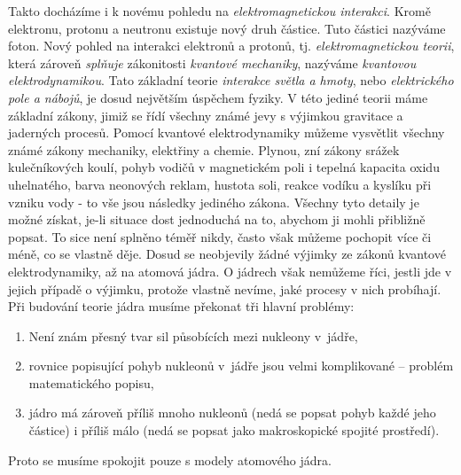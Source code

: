 {    Takto docházíme i k novému pohledu na \emph{elektromagnetickou interakci}. Kromě elektronu, 
    protonu a neutronu existuje nový druh částice. Tuto částici nazýváme foton. Nový pohled na 
    interakci elektronů a protonů, tj. \emph{elektromagnetickou teorii}, která zároveň 
    \emph{splňuje} zákonitosti \emph{kvantové mechaniky}, nazýváme \emph{kvantovou 
    elektrodynamikou}. Tato základní teorie \emph{interakce světla a hmoty}, nebo 
    \emph{elektrického pole a nábojů}, je dosud největším úspěchem fyziky. V této jediné teorii 
    máme základní zákony, jimiž se řídí všechny známé jevy s výjimkou gravitace a jaderných 
    procesů. Pomocí kvantové elektrodynamiky můžeme vysvětlit všechny známé zákony mechaniky, 
    elektřiny a chemie. Plynou, zní zákony srážek kulečníkových koulí, pohyb vodičů v magnetickém 
    poli i tepelná kapacita oxidu uhelnatého, barva neonových reklam, hustota soli, reakce vodíku a 
    kyslíku při vzniku vody - to vše jsou následky jediného zákona. Všechny tyto detaily je možné 
    získat, je-li situace dost jednoduchá na to, abychom ji mohli přibližně popsat. To sice není 
    splněno téměř nikdy, často však můžeme pochopit více či méně, co se vlastně děje. Dosud se 
    neobjevily žádné výjimky ze zákonů kvantové elektrodynamiky, až na atomová jádra. O jádrech 
    však nemůžeme říci, jestli jde v jejich případě o výjimku, protože vlastně nevíme, jaké procesy 
    v nich probíhají. Při budování teorie jádra musíme překonat tři hlavní problémy:
    \begin{enumerate}
     \item Není znám přesný tvar sil působících mezi nukleony v jádře,
     \item rovnice popisující pohyb nukleonů v jádře jsou velmi komplikované – problém  
           matematického popisu,
     \item jádro má zároveň příliš mnoho nukleonů (nedá se popsat pohyb každé jeho částice) i    
           příliš málo (nedá se popsat jako makroskopické spojité prostředí).   
    \end{enumerate}
    Proto se musíme spokojit pouze s modely atomového jádra. 
    
}
